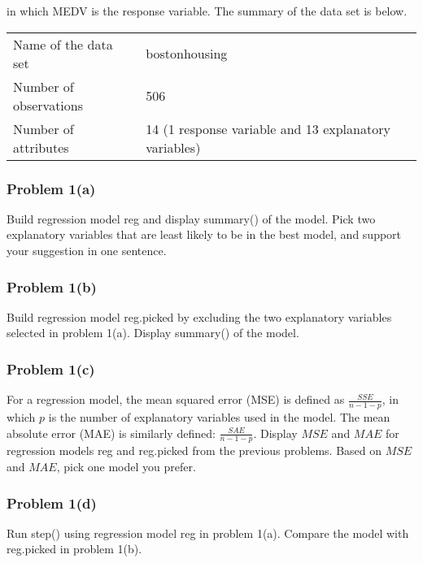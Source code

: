 \documentclass{article}
\begin{document}
\noindent in which MEDV is the response variable. The summary of the data set is below.
\vspace{0.3cm}

\begin{tabular}{lll}
Name of the data set & bostonhousing\\
Number of observations & 506 & \\
Number of attributes & 14  (1 response variable and 13 explanatory variables)\\ 
\end{tabular}




\subsubsection*{Problem 1(a)}
Build regression model \textsf{reg} and display \textsf{summary()} of the model. Pick two explanatory variables that are least likely to be in the best model, and support your suggestion in one sentence. 




\subsubsection*{Problem 1(b)}
Build regression model \textsf{reg.picked} by excluding the two explanatory variables selected in problem 1(a). Display \textsf{summary()} of the model.



\subsubsection*{Problem 1(c)}
For a regression model, the mean squared error (MSE) is defined as $\frac{SSE}{n-1-p}$, in which $p$ is the number of explanatory variables used in the model. The mean absolute error (MAE) is similarly defined: $\frac{SAE}{n-1-p}$. Display $MSE$ and $MAE$ for regression models \textsf{reg} and \textsf{reg.picked} from the previous problems. Based on $MSE$ and $MAE$, pick one model you prefer.



\subsubsection*{Problem 1(d)}
Run \textsf{step()} using regression model \textsf{reg} in problem 1(a). Compare the model with \textsf{reg.picked} in problem 1(b).
\end{document}
